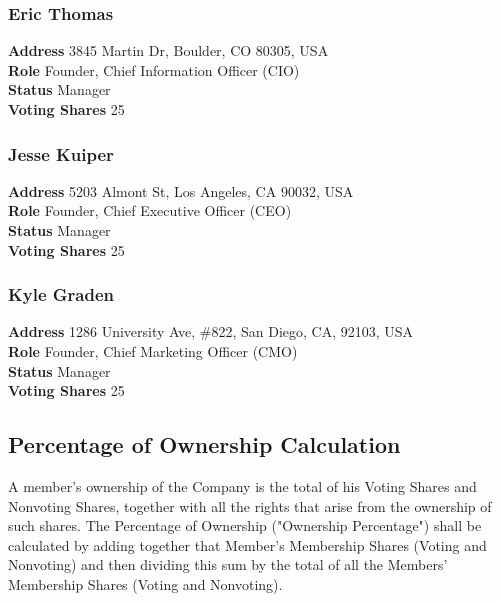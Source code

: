 \documentclass[11pt]{article}
\begin{document}
\subsubsection{Eric Thomas}
\begin{minipage}{\textwidth}
\textbf{Address} 3845 Martin Dr, Boulder, CO 80305, USA\\
\textbf{Role} Founder, Chief Information Officer (CIO)\\
\textbf{Status} Manager \\
\textbf{Voting Shares} 25
\end{minipage}

\subsubsection{Jesse Kuiper}
\begin{minipage}{\textwidth}
\textbf{Address} 5203 Almont St, Los Angeles, CA 90032, USA\\
\textbf{Role} Founder, Chief Executive Officer (CEO)\\
\textbf{Status} Manager \\
\textbf{Voting Shares} 25
\end{minipage}

\subsubsection{Kyle Graden}
\begin{minipage}{\textwidth}
\textbf{Address} 1286 University Ave, \#822, San Diego, CA, 92103, USA\\
\textbf{Role} Founder, Chief Marketing Officer (CMO)\\
\textbf{Status} Manager \\
\textbf{Voting Shares} 25
\end{minipage}

\subsection{Percentage of Ownership Calculation}
A member's ownership of the Company is the total of his Voting Shares and Nonvoting Shares, together with all the rights that arise from the ownership of such shares. The Percentage of Ownership ("Ownership Percentage") shall be calculated by adding together that Member's Membership Shares (Voting and Nonvoting) and then dividing this sum by the total of all the Members' Membership Shares (Voting and Nonvoting).
\end{document}
